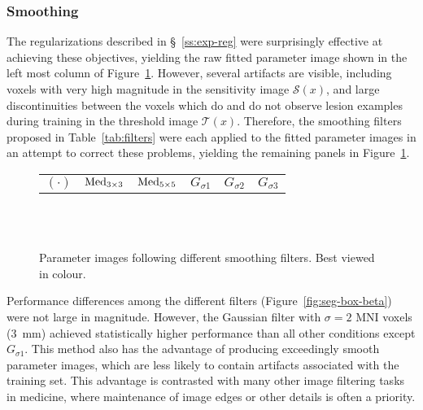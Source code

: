 \subsubsection{Smoothing}\label{sss:exp-beta-smooth}
The regularizations described in \S~\ref{ss:exp-reg} were surprisingly effective
at achieving these objectives, yielding the raw fitted parameter image
shown in the left most column of Figure~\ref{fig:beta-smooth}.
However, several artifacts are visible, including
voxels with very high magnitude in the sensitivity image $\mathcal{S}(x)$,
and large discontinuities between the voxels which
do and do not observe lesion examples during training in the threshold image $\mathcal{T}(x)$.
Therefore, the smoothing filters proposed in Table~\ref{tab:filters}
were each applied to the fitted parameter images in an attempt to correct these problems,
yielding the remaining panels in Figure~\ref{fig:beta-smooth}.
\par
\begin{figure}
  \centering
  \begin{tabu} to 4.7 %
    $(\cdot)$ & $\mathrm{Med}_{3\times3}$ & $\mathrm{Med}_{5\times5}$ & $G_{\sigma1}$ & $G_{\sigma2}$ & $G_{\sigma3}$
  \end{tabu}%
  \\[0.5em]
  \\[0.5em]
  \caption{Parameter images following different smoothing filters. Best viewed in colour.}%
  \label{fig:beta-smooth}
\end{figure}
Performance differences among the different filters
(Figure~\ref{fig:seg-box-beta}) were not large in magnitude.
However, the Gaussian filter with $\sigma = 2$ MNI voxels (\SI{3}{\milli\metre})
achieved statistically higher performance than all other conditions except $G_{\sigma1}$.
This method also has the advantage of producing exceedingly smooth parameter images,
which are less likely to contain artifacts associated with the training set.
This advantage is contrasted with many other image filtering tasks in medicine,
where maintenance of image edges or other details is often a priority.
